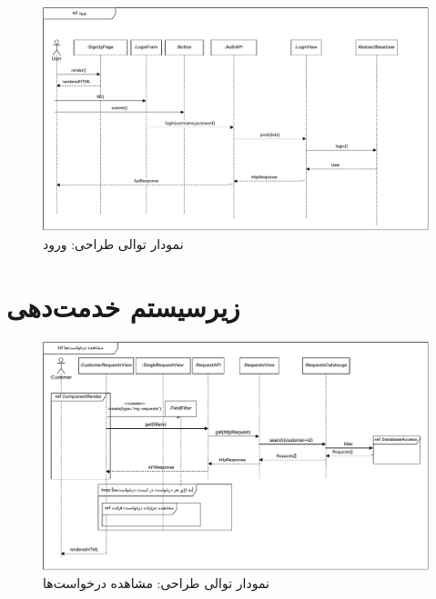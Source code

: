 \eject \pdfpagewidth=11in \pdfpageheight=7in
\begin{figure}[ht!]
	\centering
	\includegraphics[scale=0.8]{figs/design-sequence/3-2.pdf}
	\caption{نمودار توالی طراحی: ورود}
\end{figure}
\FloatBarrier
\newpage

\section{زیرسیستم خدمت‌دهی}

\eject \pdfpagewidth=11in \pdfpageheight=7in

\begin{figure}[ht!]
	\centering
	\includegraphics[scale=0.8]{figs/design-sequence/3-10.pdf}
	\caption{نمودار توالی طراحی: مشاهده درخواست‌ها}
\end{figure}
\FloatBarrier
\newpage

\eject \pdfpagewidth=10in \pdfpageheight=10in

